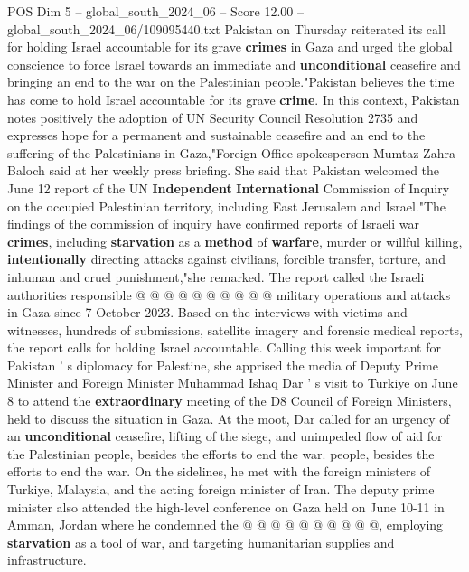 \begin{textsample}{POS Dim 5 – global\_south\_2024\_06 – Score 12.00 – global\_south\_2024\_06/109095440.txt}  \label{ex:f5_pos_230}
Pakistan on Thursday reiterated its call for holding Israel accountable for its grave \textbf{crimes} in Gaza and urged the global conscience to force Israel towards an immediate and \textbf{unconditional} ceasefire and bringing an end to the war on the Palestinian people."Pakistan believes the time has come to hold Israel accountable for its grave \textbf{crime}.
In this context, Pakistan notes positively the adoption of UN Security Council Resolution 2735 and expresses hope for a permanent and sustainable ceasefire and an end to the suffering of the Palestinians in Gaza,"Foreign Office spokesperson Mumtaz Zahra Baloch said at her weekly press briefing.
She said that Pakistan welcomed the June 12 report of the UN \textbf{Independent} \textbf{International} Commission of Inquiry on the occupied Palestinian territory, including East Jerusalem and Israel."The findings of the commission of inquiry have confirmed reports of Israeli war \textbf{crimes}, including \textbf{starvation} as a \textbf{method} of \textbf{warfare}, murder or willful killing, \textbf{intentionally} directing attacks against civilians, forcible transfer, torture, and inhuman and cruel punishment,"she remarked.
The report called the Israeli authorities responsible @ @ @ @ @ @ @ @ @ @ military operations and attacks in Gaza since 7 October 2023.
Based on the interviews with victims and witnesses, hundreds of submissions, satellite imagery and forensic medical reports, the report calls for holding Israel accountable.
Calling this week important for Pakistan ' s diplomacy for Palestine, she apprised the media of Deputy Prime Minister and Foreign Minister Muhammad Ishaq Dar ' s visit to Turkiye on June 8 to attend the \textbf{extraordinary} meeting of the D8 Council of Foreign Ministers, held to discuss the situation in Gaza.
At the moot, Dar called for an urgency of an \textbf{unconditional} ceasefire, lifting of the siege, and unimpeded flow of aid for the Palestinian people, besides the efforts to end the war. people, besides the efforts to end the war.
On the sidelines, he met with the foreign ministers of Turkiye, Malaysia, and the acting foreign minister of Iran.
The deputy prime minister also attended the high-level conference on Gaza held on June 10-11 in Amman, Jordan where he condemned the @ @ @ @ @ @ @ @ @ @, employing \textbf{starvation} as a tool of war, and targeting humanitarian supplies and infrastructure.

\end{textsample}

